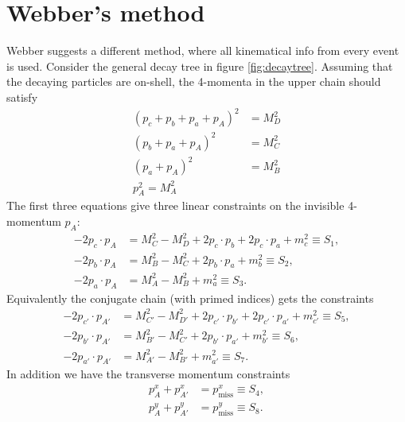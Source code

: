 \documentclass[twoside,english]{uiofysmaster}
\begin{document}
\section{Webber's method}
Webber \cite{Webber:2009vm} suggests a different method, where all kinematical info from every event is used. Consider the general decay tree in figure \ref{fig:decaytree}. Assuming that the decaying particles are on-shell, the 4-momenta in the upper chain should satisfy
\begin{align}
	(p_c + p_b + p_a + p_A)^2 &= M_D^2\nonumber \\
	(p_b + p_a + p_A)^2 &= M_C^2\nonumber \\
	(p_a + p_A)^2 &= M_B^2\label{eq:constraints}\\
	p_A^2 = M_A^2\nonumber
\end{align}
The first three equations give three linear constraints on the invisible 4-momentum $p_A$:
\begin{align}
	-2p_c\cdot p_A &= M_C^2 - M_D^2 + 2p_c\cdot p_b + 2p_c \cdot p_a + m_c^2 \equiv S_1,\nonumber \\
	-2p_b\cdot p_A &= M_B^2 - M_C^2 + 2p_b\cdot p_a + m_b^2 \equiv S_2,\\
	-2p_a\cdot p_A &= M_A^2 - M_B^2 + m_a^2 \equiv S_3. \nonumber
\end{align}
Equivalently the conjugate chain (with primed indices) gets the constraints
\begin{align}
	-2p_{c'}\cdot p_{A'} &= M_{C'}^2 - M_{D'}^2 + 2p_{c'}\cdot p_{b'} + 2p_{c'} \cdot p_{a'} + m_{c'}^2 \equiv S_5,\nonumber \\ 
	-2p_{b'}\cdot p_{A'} &= M_{B'}^2 - M_{C'}^2 + 2p_{b'}\cdot p_{a'} + m_{b'}^2 \equiv S_6,\\
	-2p_{a'}\cdot p_{A'} &= M_{A'}^2 - M_{B'}^2 + m_{a'}^2 \equiv S_7.\nonumber
\end{align}
In addition we have the transverse momentum constraints
\begin{align}
	p_A^x + p_{A'}^x &= p_\mathrm{miss}^x \equiv S_4, \label{eq:Svec_orig} \\
	p_A^y + p_{A'}^y &= p_\mathrm{miss}^y \equiv S_8. \nonumber
\end{align}
\end{document}
